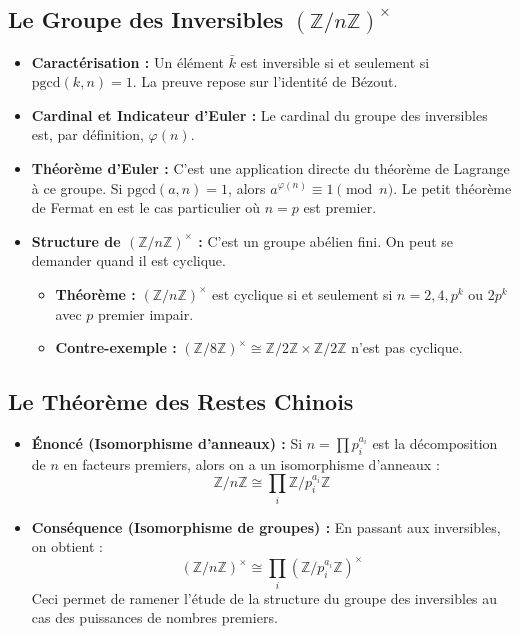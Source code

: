 \documentclass[12pt, a4paper, parskip=full]{report}
\theoremstyle{agregstyle}
\begin{document}
\subsection{Le Groupe des Inversibles $(\mathbb{Z}/n\mathbb{Z})^\times$}
\begin{itemize}
    \item \textbf{Caractérisation :} Un élément $\bar{k}$ est inversible si et seulement si $\mathrm{pgcd}(k,n)=1$. La preuve repose sur l'identité de Bézout.
    \item \textbf{Cardinal et Indicateur d'Euler :} Le cardinal du groupe des inversibles est, par définition, $\varphi(n)$.
    \item \textbf{Théorème d'Euler :} C'est une application directe du théorème de Lagrange à ce groupe. Si $\mathrm{pgcd}(a,n)=1$, alors $a^{\varphi(n)} \equiv 1 \pmod n$. Le petit théorème de Fermat en est le cas particulier où $n=p$ est premier.
    \item \textbf{Structure de $(\mathbb{Z}/n\mathbb{Z})^\times$ :} C'est un groupe abélien fini. On peut se demander quand il est cyclique.
        \begin{itemize}
            \item \textbf{Théorème :} $(\mathbb{Z}/n\mathbb{Z})^\times$ est cyclique si et seulement si $n=2, 4, p^k$ ou $2p^k$ avec $p$ premier impair.
            \item \textbf{Contre-exemple :} $(\mathbb{Z}/8\mathbb{Z})^\times \cong \mathbb{Z}/2\mathbb{Z} \times \mathbb{Z}/2\mathbb{Z}$ n'est pas cyclique.
        \end{itemize}
\end{itemize}

\subsection{Le Théorème des Restes Chinois}
\begin{itemize}
    \item \textbf{Énoncé (Isomorphisme d'anneaux) :} Si $n = \prod p_i^{a_i}$ est la décomposition de $n$ en facteurs premiers, alors on a un isomorphisme d'anneaux :
    $$ \mathbb{Z}/n\mathbb{Z} \cong \prod_{i} \mathbb{Z}/p_i^{a_i}\mathbb{Z} $$
    \item \textbf{Conséquence (Isomorphisme de groupes) :} En passant aux inversibles, on obtient :
    $$ (\mathbb{Z}/n\mathbb{Z})^\times \cong \prod_{i} (\mathbb{Z}/p_i^{a_i}\mathbb{Z})^\times $$
    Ceci permet de ramener l'étude de la structure du groupe des inversibles au cas des puissances de nombres premiers.
\end{itemize}
\end{document}
